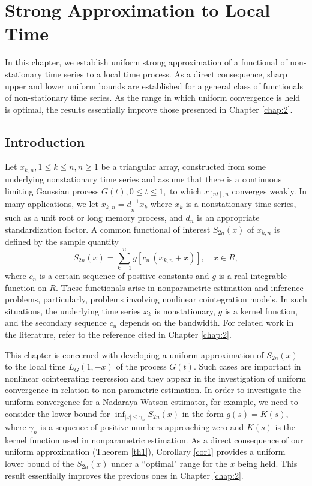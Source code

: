 \chapter{Strong Approximation to Local Time} 
\ifpdf
    \graphicspath{{Chapter3/Chapter3Figs/PNG/}{Chapter3/Chapter3Figs/PDF/}{Chapter3/Chapter3Figs/}}
\else
    \graphicspath{{Chapter3/Chapter3Figs/EPS/}{Chapter3/Chapter3Figs/}}
\fi

In this chapter, we establish uniform strong approximation of a functional of non-stationary time series to a local time process. As a direct consequence, sharp upper and lower uniform bounds are established for a general class of functionals of non-stationary time series. As the range in which uniform convergence is held is optimal, the results essentially improve those presented in Chapter \ref{chap:2}.

\section{Introduction}
Let ${x_{k,n},1\leq k\leq n,n\geq 1}$
 be  a triangular  array, constructed from some
underlying nonstationary time series and assume that there is a continuous
limiting Gaussian process $G(t),0\leq t\leq 1,$ to which $x_{[nt],n}$
converges weakly. In many applications, we let ${x_{k,n}=d}_{n}^{-1}{x}%
_{k}$ where $x_{k}$ is a nonstationary time series, such as a unit root or
long memory process, and $d_{n}$ is an appropriate standardization
factor. A common functional of interest $S_{2n}(x)$ of $x_{k,n}$ is defined by
the sample quantity%
\begin{equation}
S_{2n} (x)=\sum_{k=1}^{n}g[c_{n}\,(x_{k,n}+x)], \quad x\in R,
\end{equation}
where $c_{n}$ is a certain sequence of positive constants and $g$ is a real
integrable function on $R$. These functionals arise in nonparametric
estimation and inference  problems, particularly, problems involving nonlinear cointegration
models. In such situations, the underlying time series $x_{k}$ is nonstationary, $g$ is a
kernel function, and the secondary sequence $c_{n}$ depends on the bandwidth. For related work in the literature, refer to the reference cited in Chapter \ref{chap:2}.

This chapter is concerned with developing a uniform approximation of $S_{2n}(x)$ to the local time $L_{G}(1,-x)$ of the process $G(t)$. Such cases are important in nonlinear cointegrating regression and they appear in the investigation  of   uniform convergence in relation to  non-parametric estimation.  In order to investigate the uniform convergence for a Nadaraya-Watson estimator, for example, we need to consider the lower bound for $\inf _{|x|\le \gamma_n}S_{2n}(x)$ in
the form $g( s) =K( s),$ where $\gamma_n$ is a sequence of positive numbers approaching zero and $K(s) $ is the kernel function used in nonparametric estimation. As  a direct consequence of our uniform approximation  (Theorem \ref{th1}), Corollary \ref{cor1} provides a uniform lower  bound of the $S_{2n}(x)$ under  a ``optimal" range for the $x$ being held. This result essentially improves the previous ones in Chapter \ref{chap:2}. 

